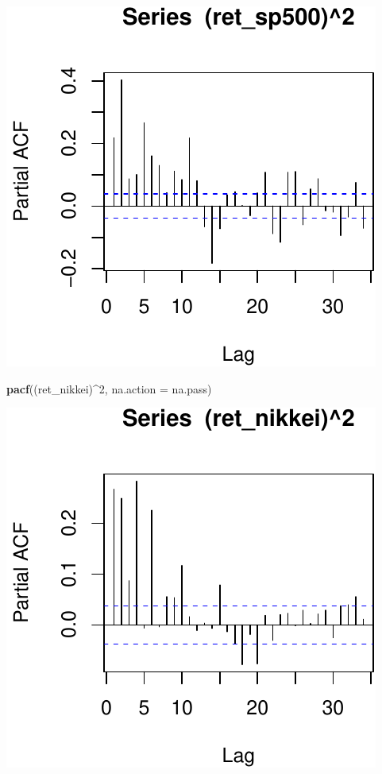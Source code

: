 \documentclass[11pt,]{article}
\newenvironment{Shaded}{\begin{snugshade}}{\end{snugshade}}
\newcommand{\KeywordTok}[1]{\textcolor[rgb]{0.13,0.29,0.53}{\textbf{#1}}}
\newcommand{\DataTypeTok}[1]{\textcolor[rgb]{0.13,0.29,0.53}{#1}}
\newcommand{\DecValTok}[1]{\textcolor[rgb]{0.00,0.00,0.81}{#1}}
\newcommand{\OperatorTok}[1]{\textcolor[rgb]{0.81,0.36,0.00}{\textbf{#1}}}
\newcommand{\NormalTok}[1]{#1}
\begin{document}
\begin{center}\includegraphics{FMC_T4_PhD_ARMA_GARCH_files/figure-latex/ARCH_order-2} \end{center}

\begin{Shaded}
\begin{Highlighting}[]
\KeywordTok{pacf}\NormalTok{((ret_nikkei)}\OperatorTok{^}\DecValTok{2}\NormalTok{, }\DataTypeTok{na.action =}\NormalTok{ na.pass)}
\end{Highlighting}
\end{Shaded}

\begin{center}\includegraphics{FMC_T4_PhD_ARMA_GARCH_files/figure-latex/ARCH_order-3} \end{center}
\end{document}
